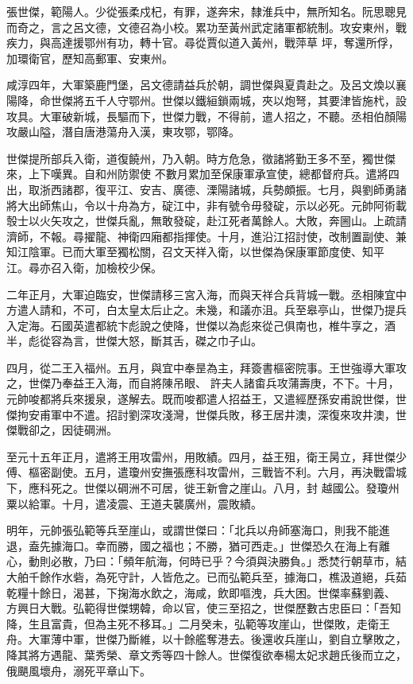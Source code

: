\begin{pinyinscope}
 張世傑，範陽人。少從張柔戍杞，有罪，遂奔宋，隸淮兵中，無所知名。阮思聰見而奇之，言之呂文德，文德召為小校。累功至黃州武定諸軍都統制。攻安東州，戰疾力，與高達援鄂州有功，轉十官。尋從賈似道入黃州，戰萍草
 坪，奪還所俘，加環衛官，歷知高郵軍、安東州。



 咸淳四年，大軍築鹿門堡，呂文德請益兵於朝，調世傑與夏貴赴之。及呂文煥以襄陽降，命世傑將五千人守鄂州。世傑以鐵絙鎖兩城，夾以炮弩，其要津皆施杙，設攻具。大軍破新城，長驅而下，世傑力戰，不得前，遣人招之，不聽。丞相伯顏陽攻嚴山隘，潛自唐港蕩舟入漢，東攻鄂，鄂降。



 世傑提所部兵入衛，道復饒州，乃入朝。時方危急，徵諸將勤王多不至，獨世傑來，上下嘆異。自和州防禦使
 不數月累加至保康軍承宣使，總都督府兵。遣將四出，取浙西諸郡，復平江、安吉、廣德、溧陽諸城，兵勢頗振。七月，與劉師勇諸將大出師焦山，令以十舟為方，碇江中，非有號令毋發碇，示以必死。元帥阿術載彀士以火矢攻之，世傑兵亂，無敢發碇，赴江死者萬餘人。大敗，奔圌山。上疏請濟師，不報。尋擢龍、神衛四廂都指揮使。十月，進沿江招討使，改制置副使、兼知江陰軍。已而大軍至獨松關，召文天祥入衛，以世傑為保康軍節度使、知平
 江。尋亦召入衛，加檢校少保。



 二年正月，大軍迫臨安，世傑請移三宮入海，而與天祥合兵背城一戰。丞相陳宜中方遣人請和，不可，白太皇太后止之。未幾，和議亦沮。兵至皋亭山，世傑乃提兵入定海。石國英遣都統卞彪說之使降，世傑以為彪來從己俱南也，椎牛享之，酒半，彪從容為言，世傑大怒，斷其舌，磔之巾子山。



 四月，從二王入福州。五月，與宜中奉昰為主，拜簽書樞密院事。王世強導大軍攻之，世傑乃奉益王入海，而自將陳吊眼、
 許夫人諸畬兵攻蒲壽庚，不下。十月，元帥唆都將兵來援泉，遂解去。既而唆都遣人招益王，又遣經歷孫安甫說世傑，世傑拘安甫軍中不遣。招討劉深攻淺灣，世傑兵敗，移王居井澳，深復來攻井澳，世傑戰卻之，因徒碙洲。



 至元十五年正月，遣將王用攻雷州，用敗績。四月，益王殂，衛王昺立，拜世傑少傅、樞密副使。五月，遣瓊州安撫張應科攻雷州，三戰皆不利。六月，再決戰雷城下，應科死之。世傑以碙洲不可居，徙王新會之崖山。八月，封
 越國公。發瓊州粟以給軍。十月，遣凌震、王道夫襲廣州，震敗績。



 明年，元帥張弘範等兵至崖山，或謂世傑曰：「北兵以舟師塞海口，則我不能進退，盍先據海口。幸而勝，國之福也；不勝，猶可西走。」世傑恐久在海上有離心，動則必散，乃曰：「頻年航海，何時已乎？今須與決勝負。」悉焚行朝草市，結大舶千餘作水砦，為死守計，人皆危之。已而弘範兵至，據海口，樵汲道絕，兵茹乾糧十餘日，渴甚，下掬海水飲之，海咸，飲即嘔洩，兵大困。世傑率蘇劉義、
 方興日大戰。弘範得世傑甥韓，命以官，使三至招之，世傑歷數古忠臣曰：「吾知降，生且富貴，但為主死不移耳。」二月癸未，弘範等攻崖山，世傑敗，走衛王舟。大軍薄中軍，世傑乃斷維，以十餘艦奪港去。後還收兵崖山，劉自立擊敗之，降其將方遇龍、葉秀榮、章文秀等四十餘人。世傑復欲奉楊太妃求趙氏後而立之，俄颶風壞舟，溺死平章山下。




\end{pinyinscope}
